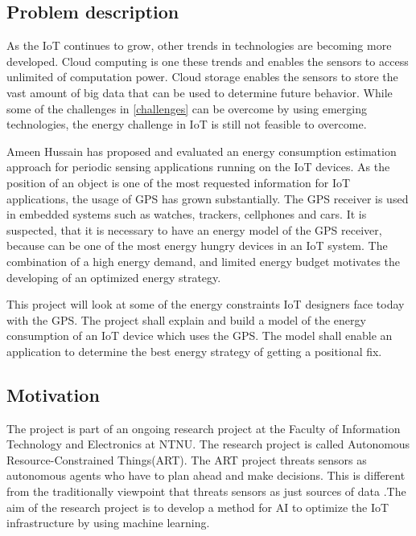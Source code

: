 \subsection{Problem description}

As the  IoT continues to grow, other trends in technologies are becoming more developed. Cloud computing is one these trends  and enables the sensors to access unlimited of computation power\cite{Cloud}. Cloud storage enables the sensors to store the vast amount of big data that can be used to determine future behavior. While some of the challenges in \ref{challenges} can be overcome by using emerging technologies, the energy challenge in IoT is still not feasible to overcome. 

Ameen Hussain has proposed and evaluated an energy consumption estimation approach for periodic sensing applications running on the IoT devices\cite{Amen}. As the position of an object is one of the most requested information for IoT applications, the usage of GPS has grown substantially. The GPS receiver is used in embedded systems such as watches, trackers, cellphones and cars. It is suspected, that it is necessary to have an energy model of the GPS receiver, because can be one of the most energy hungry devices in an IoT system. The combination of a high energy demand, and limited energy budget motivates the developing of an optimized energy strategy. 

This project will look at some of the energy constraints IoT designers face today with the GPS. The project shall explain and build a model of the energy consumption of an IoT device which uses the GPS. The model shall enable an application to determine the best energy strategy of getting a positional fix. 



\subsection{Motivation}

The project is part of an ongoing research project at the Faculty of Information Technology and Electronics at NTNU. The research project is called Autonomous Resource-Constrained Things(ART).  The ART project threats sensors as autonomous agents who have to plan ahead and make decisions. This is different from the traditionally viewpoint that threats sensors as just sources of data \cite{kraemer}.The aim of the research project is to develop a method for AI to optimize the IoT infrastructure by using machine learning.



